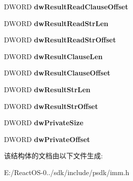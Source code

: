 \begin{DoxyCompactItemize}
D\+W\+O\+RD {\bfseries dw\+Result\+Read\+Clause\+Offset}
\item 
\mbox{\label{structtag_c_o_m_p_o_s_i_t_i_o_n_s_t_r_i_n_g_ae07df7898932214b53bae829b90c27d9}} 
D\+W\+O\+RD {\bfseries dw\+Result\+Read\+Str\+Len}
\item 
\mbox{\label{structtag_c_o_m_p_o_s_i_t_i_o_n_s_t_r_i_n_g_a39e1d460366252e1688acaa96aa49261}} 
D\+W\+O\+RD {\bfseries dw\+Result\+Read\+Str\+Offset}
\item 
\mbox{\label{structtag_c_o_m_p_o_s_i_t_i_o_n_s_t_r_i_n_g_a8d3874b1015f1ea0d496398eee3e8b47}} 
D\+W\+O\+RD {\bfseries dw\+Result\+Clause\+Len}
\item 
\mbox{\label{structtag_c_o_m_p_o_s_i_t_i_o_n_s_t_r_i_n_g_ad2d05f076ce92c81b2e5301909411a65}} 
D\+W\+O\+RD {\bfseries dw\+Result\+Clause\+Offset}
\item 
\mbox{\label{structtag_c_o_m_p_o_s_i_t_i_o_n_s_t_r_i_n_g_a946335a95bc456ff3166f8b0c34ef231}} 
D\+W\+O\+RD {\bfseries dw\+Result\+Str\+Len}
\item 
\mbox{\label{structtag_c_o_m_p_o_s_i_t_i_o_n_s_t_r_i_n_g_a12ae8b54496405575858a3ff6606451a}} 
D\+W\+O\+RD {\bfseries dw\+Result\+Str\+Offset}
\item 
\mbox{\label{structtag_c_o_m_p_o_s_i_t_i_o_n_s_t_r_i_n_g_a31fabb4da7f4472254eaf83fdd54f798}} 
D\+W\+O\+RD {\bfseries dw\+Private\+Size}
\item 
\mbox{\label{structtag_c_o_m_p_o_s_i_t_i_o_n_s_t_r_i_n_g_afdf284205b00f71e939da0b0dd30d5b8}} 
D\+W\+O\+RD {\bfseries dw\+Private\+Offset}
\end{DoxyCompactItemize}


该结构体的文档由以下文件生成\+:\begin{DoxyCompactItemize}
\item 
E\+:/\+React\+O\+S-\/0../sdk/include/psdk/imm.\+h\end{DoxyCompactItemize}
